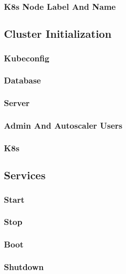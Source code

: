 \subsubsection{K8s Node Label And Name}
\label{subsubsec:implementation_installer_node_registration_k8s_node_label_and_name}

\subsection{Cluster Initialization}
\label{subsec:implementation_installer_cluster_initialization}

\subsubsection{Kubeconfig}
\label{subsubsec:implementation_installer_cluster_initialization_kubeconfig}

\subsubsection{Database}
\label{subsubsec:implementation_installer_cluster_initialization_database}

\subsubsection{Server}
\label{subsubsec:implementation_installer_cluster_initialization_server}

\subsubsection{Admin And Autoscaler Users}
\label{subsubsec:implementation_installer_cluster_initialization_admin_and_autoscaler_users}

\subsubsection{K8s}
\label{subsubsec:implementation_installer_cluster_initialization_k8s}

\subsection{Services}
\label{subsec:implementation_installer_services}

\subsubsection{Start}
\label{subsubsec:implementation_installer_services_start}

\subsubsection{Stop}
\label{subsubsec:implementation_installer_services_stop}

\subsubsection{Boot}
\label{subsubsec:implementation_installer_services_boot}

\subsubsection{Shutdown}
\label{subsubsec:implementation_installer_services_shutdown}